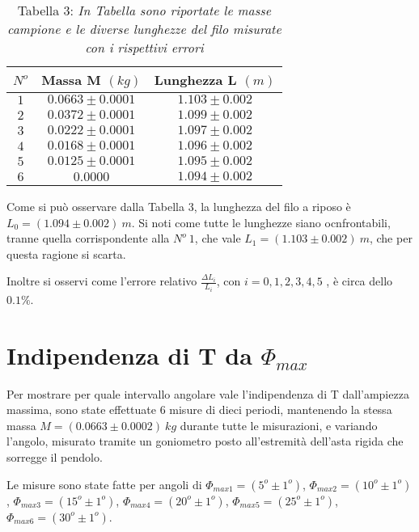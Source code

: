 \documentclass[12pt, a4paper]{article}
\begin{document}
\begin{table}[!htb]
    \centering
        \begin{tabular}{|c|c|c|}
            \hline
            $N^o$ &Massa M $(kg)$&Lunghezza L $(m)$\\
            \hline
            $1$ & $0.0663\pm0.0001$&$1.103\pm0.002$\\
            $2$ & $0.0372\pm0.0001$&$1.099\pm0.002$\\
            $3$ & $0.0222\pm0.0001$&$1.097\pm0.002$\\
            $4$ & $0.0168\pm0.0001$&$1.096\pm0.002$\\
            $5$ & $0.0125\pm0.0001$&$1.095\pm0.002$\\
            $6$ & $0.0000$         &$1.094\pm0.002$\\
           
            \hline
        \end{tabular}
        \label{Tab Lunghezze}
        \caption*{\centering Tabella 3: \textit{\footnotesize In Tabella sono riportate le masse campione e le diverse lunghezze del filo misurate con i rispettivi errori }}
        \end{table}


Come si può osservare dalla Tabella 3, la lunghezza del filo a riposo è $L_0=(1.094\pm0.002)\ m$. Si noti come tutte le lunghezze siano ocnfrontabili, tranne quella corrispondente alla $N^o\ 1$, che vale $L_1=(1.103\pm0.002)\ m$, che per questa ragione si scarta.

Inoltre si osservi come l'errore relativo $\displaystyle \frac{\Delta L_i}{L_i}$, con $i={0,1,2,3,4,5}$ , è circa dello $0.1\%$.




\section{Indipendenza di T da $\Phi_{max}$}

Per mostrare per quale intervallo angolare vale l'indipendenza di T dall'ampiezza massima, sono state effettuate 6 misure di dieci periodi, mantenendo la stessa massa $M=(0.0663\pm0.0002)\ kg$ durante tutte le misurazioni, e variando l'angolo, misurato tramite un goniometro posto all'estremità dell'asta rigida che sorregge il pendolo. 

Le misure sono state fatte per angoli di $\Phi_{max1}=(5^o\pm1^o)$, $\Phi_{max2}=(10^o\pm1^o)$, $\Phi_{max3}=(15^o\pm1^o)$, $\Phi_{max4}=(20^o\pm1^o)$, $\Phi_{max5}=(25^o\pm1^o)$, $\Phi_{max6}=(30^o\pm1^o)$.
\end{document}
